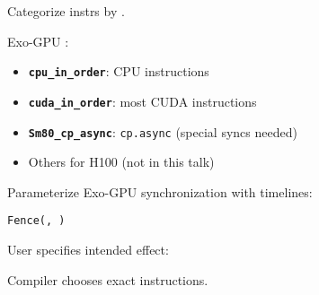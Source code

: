 \begin{center}
\Large
\begin{tikzpicture}[node distance=0mm]

\end{tikzpicture}
\end{center}

\newpage
{}

{\LARGE
Categorize instrs by .

Exo-GPU :
\begin{itemize}
  \item \textbf{\texttt{cpu\_in\_order}}: CPU instructions
  \item \textbf{\texttt{cuda\_in\_order}}: most CUDA instructions
  \item \textbf{\texttt{Sm80\_cp\_async}}: \texttt{cp.async} (special syncs needed)
  \item Others for H100 (not in this talk)
\end{itemize}

}

\newpage
{}

{\LARGE
Parameterize Exo-GPU synchronization with timelines:

\begin{center}
  \texttt{Fence(, )}
\end{center}

User specifies intended effect:

\begin{center}
\end{center}

Compiler chooses exact instructions.


}

\newpage
{}

